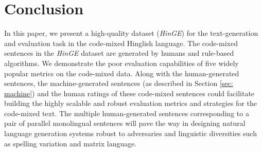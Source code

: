 \documentclass[11pt]{article}
\begin{document}
\section{Conclusion}
In this paper, we present a high-quality dataset (\textit{HinGE}) for the text-generation and evaluation task in the code-mixed Hinglish language. The code-mixed sentences in the \textit{HinGE} dataset are generated by humans and rule-based algorithms. We demonstrate the poor evaluation capabilities of five widely popular metrics on the code-mixed data.
Along with the human-generated sentences, the machine-generated sentences (as described in Section \ref{sec: machine}) and the human ratings of these code-mixed sentences could facilitate building the highly scalable and robust evaluation metrics and strategies for the code-mixed text. The multiple human-generated sentences corresponding to a pair of parallel monolingual sentences will pave the way in designing natural language generation systems robust to adversaries and linguistic diversities such as spelling variation and matrix language. 



\flushend
\end{document}
